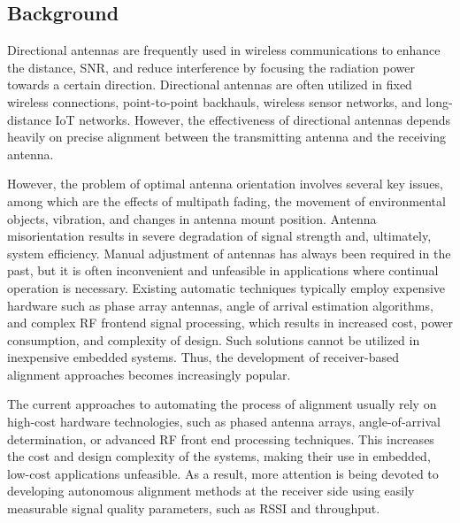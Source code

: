 \subsection{Background}

Directional antennas are frequently used in wireless communications to enhance the distance, SNR, and reduce interference by focusing the radiation power towards a certain direction. Directional antennas are often utilized in fixed wireless connections, point-to-point backhauls, wireless sensor networks, and long-distance IoT networks. However, the effectiveness of directional antennas depends heavily on precise alignment between the transmitting antenna and the receiving antenna.

However, the problem of optimal antenna orientation involves several key issues, among which are the effects of multipath fading, the movement of environmental objects, vibration, and changes in antenna mount position. Antenna misorientation results in severe degradation of signal strength and, ultimately, system efficiency. Manual adjustment of antennas has always been required in the past, but it is often inconvenient and unfeasible in applications where continual operation is necessary. Existing automatic techniques typically employ expensive hardware such as phase array antennas, angle of arrival estimation algorithms, and complex RF frontend signal processing, which results in increased cost, power consumption, and complexity of design. Such solutions cannot be utilized in inexpensive embedded systems. Thus, the development of receiver-based alignment approaches becomes increasingly popular.

The current approaches to automating the process of alignment usually rely on high-cost hardware technologies, such as phased antenna arrays, angle-of-arrival determination, or advanced RF front end processing techniques. This increases the cost and design complexity of the systems, making their use in embedded, low-cost applications unfeasible. As a result, more attention is being devoted to developing autonomous alignment methods at the receiver side using easily measurable signal quality parameters, such as RSSI and throughput.